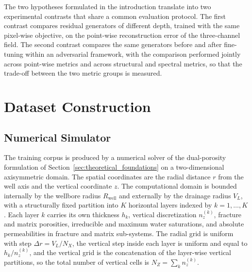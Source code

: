 The two hypotheses formulated in the introduction translate into two experimental contrasts that share a common evaluation protocol. The first contrast compares residual generators of different depth, trained with the same pixel-wise objective, on the point-wise reconstruction error of the three-channel field. The second contrast compares the same generators before and after fine-tuning within an adversarial framework, with the comparison performed jointly across point-wise metrics and across structural and spectral metrics, so that the trade-off between the two metric groups is measured.


\section{Dataset Construction}
\label{sec:method_dataset}

\subsection{Numerical Simulator}
\label{subsec:method_simulator}

The training corpus is produced by a numerical solver of the dual-porosity formulation of Section~\ref{sec:theoretical_foundations} on a two-dimensional axisymmetric domain. The spatial coordinates are the radial distance $r$ from the well axis and the vertical coordinate $z$. The computational domain is bounded internally by the wellbore radius $R_{\text{well}}$ and externally by the drainage radius $V_L$, with a structurally fixed partition into $K$ horizontal layers indexed by $k = 1, \dots, K$. Each layer $k$ carries its own thickness $h_k$, vertical discretization $n_z^{(k)}$, fracture and matrix porosities, irreducible and maximum water saturations, and absolute permeabilities in fracture and matrix sub-systems. The radial grid is uniform with step $\Delta r = V_L / N_X$, the vertical step inside each layer is uniform and equal to $h_k / n_z^{(k)}$, and the vertical grid is the concatenation of the layer-wise vertical partitions, so the total number of vertical cells is $N_Z = \sum_k n_z^{(k)}$.

